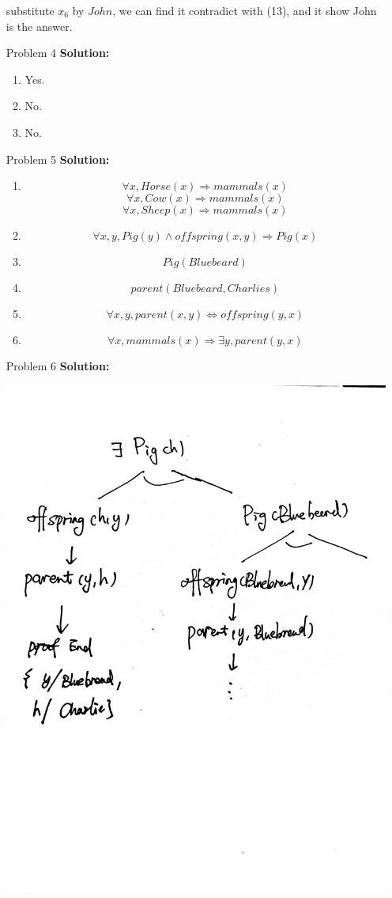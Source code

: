 \normalfont\documentclass[letterpaper,11pt]{article}
\begin{document}
\begin{enumerate}
	substitute $x_6$ by $John$, we can find it contradict with (13), and it show John is the answer.
\item[Problem 4]\textbf{Solution:}\par
	\begin{enumerate}
		\item Yes.
		\item No.
		\item No.
	\end{enumerate}
\item[Problem 5]\textbf{Solution:}\par
	\begin{enumerate}
		\item 
		$$\forall x, Horse(x) \Rightarrow mammals(x)$$
		$$\forall x, Cow(x) \Rightarrow mammals(x)$$
		$$\forall x, Sheep(x) \Rightarrow mammals(x)$$
		\item 
		$$\forall x,y, Pig(y) \land offspring(x,y) \Rightarrow Pig(x)$$
		\item 
		$$Pig(Bluebeard)$$
		\item
		$$parent(Bluebeard,Charlies)$$
		\item
		$$\forall x,y, parent(x,y) \Leftrightarrow offspring(y,x)$$
		\item
		$$\forall x,mammals(x) \Rightarrow \exists y, parent(y,x)$$
	\end{enumerate}	
\item[Problem 6]\textbf{Solution:}\par
\includegraphics[width=4  in]{1.jpg}\par

\end{enumerate}
\end{document}
